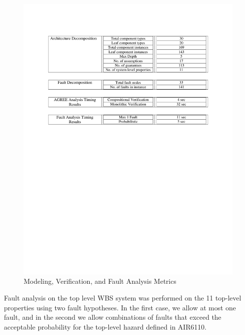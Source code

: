 \begin{figure}[h!]
	\vspace{-0.17in}
	\begin{center}
		\includegraphics[trim=0 435 0 90,clip,width=1.0\textwidth]{images/arch_table.pdf}
		\caption{Modeling, Verification, and Fault Analysis Metrics}
 		\label{fig:metrics}
	\end{center}
	\vspace{-0.40in}
\end{figure}
\fi


Fault analysis on the top level WBS system was performed on the 11 top-level properties using two fault hypotheses.  In the first case, we allow at most one fault, and in the second we allow combinations of faults that exceed the acceptable probability for the top-level hazard defined in AIR6110.

